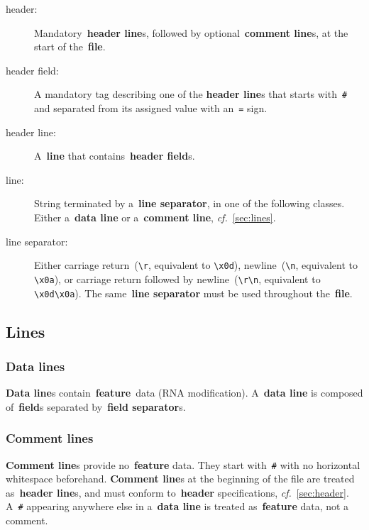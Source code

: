 \documentclass[11pt]{article}
\begin{document}
\begin{description}
\item[header:]
  Mandatory~\textbf{header line}s, followed by optional~\textbf{comment line}s, at the start of the~\textbf{file}.

\item[header field:]
  A mandatory tag describing one of the \textbf{header line}s that starts with~\texttt{\#} and separated from its assigned value with an~\texttt{=} sign. 
  
\item[header line:]
  A~\textbf{line} that contains~\textbf{header field}s.
  
\item[line:]
  String terminated by a~\textbf{line separator}, in one of the following classes.
  Either a~\textbf{data line} or a~\textbf{comment line}, \textit{cf.}~\autoref{sec:lines}.

\item[line separator:]
  Either carriage return~(\texttt{{\textbackslash}r}, equivalent to \texttt{{\textbackslash}x0d}), newline~(\texttt{{\textbackslash}n}, equivalent to \texttt{{\textbackslash}x0a}), or carriage return followed by newline~(\texttt{{\textbackslash}r{\textbackslash}n}, equivalent to \texttt{{\textbackslash}x0d{\textbackslash}x0a}).
  The same~\textbf{line separator} must be used throughout the~\textbf{file}.
\end{description}

\subsection{Lines}\label{sec:lines}

\subsubsection{Data lines}

\textbf{Data line}s contain~\textbf{feature}~data (RNA modification).
A~\textbf{data line} is composed of~\textbf{field}s separated by~\textbf{field separator}s.

\subsubsection{Comment lines}

\textbf{Comment line}s provide no~\textbf{feature} data. They start with~\texttt{\#} with no horizontal whitespace beforehand.
\textbf{Comment line}s at the beginning of the file are treated as~\textbf{header line}s, and must conform to~\textbf{header} specifications, \textit{cf.}~\autoref{sec:header}. A~\texttt{\#} appearing anywhere else in a~\textbf{data line} is treated as~\textbf{feature} data, not a comment.
\end{document}
